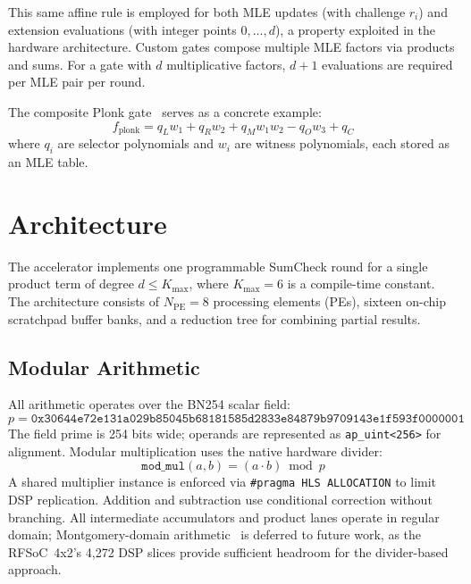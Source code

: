 \documentclass[conference]{IEEEtran}
\begin{document}
This same affine rule is employed for both MLE updates (with challenge $r_i$) and extension evaluations (with integer points $0,\dots,d$), a property exploited in the hardware architecture. Custom gates compose multiple MLE factors via products and sums. For a gate with $d$ multiplicative factors, $d+1$ evaluations are required per MLE pair per round.

The composite Plonk gate~\cite{gabizon2019plonk} serves as a concrete example:
\begin{equation}
f_{\text{plonk}} = q_L w_1 + q_R w_2 + q_M w_1 w_2 - q_O w_3 + q_C
\end{equation}
where $q_i$ are selector polynomials and $w_i$ are witness polynomials, each stored as an MLE table.

\section{Architecture}

The accelerator implements one programmable SumCheck round for a single product term of degree $d \leq K_{\max}$, where $K_{\max}=6$ is a compile-time constant. The architecture consists of $N_{\mathrm{PE}}=8$ processing elements (PEs), sixteen on-chip scratchpad buffer banks, and a reduction tree for combining partial results.

\subsection{Modular Arithmetic}

All arithmetic operates over the BN254 scalar field:
\begin{equation}
p = \texttt{0x30644e72e131a029b85045b68181585d2833e84879b9709143e1f593f0000001}
\end{equation}
The field prime is 254 bits wide; operands are represented as \texttt{ap\_uint<256>} for alignment. Modular multiplication uses the native hardware divider:
\begin{equation}
\texttt{mod\_mul}(a,b) = (a \cdot b) \bmod p
\end{equation}
A shared multiplier instance is enforced via \texttt{\#pragma HLS ALLOCATION} to limit DSP replication. Addition and subtraction use conditional correction without branching. All intermediate accumulators and product lanes operate in regular domain; Montgomery-domain arithmetic~\cite{montgomery1985modular} is deferred to future work, as the RFSoC~4x2's 4,272 DSP slices provide sufficient headroom for the divider-based approach.
\end{document}
